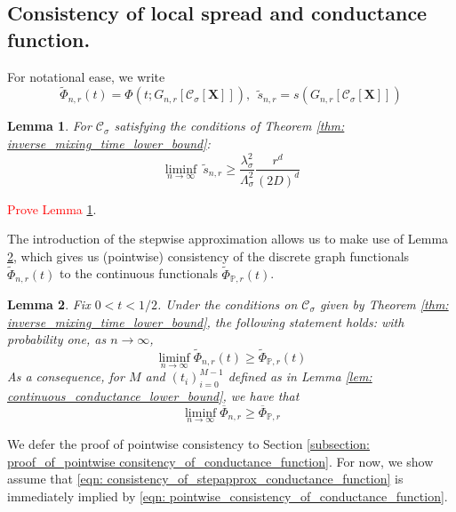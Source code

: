 \documentclass{article}
\newcommand{\1}{\mathbf{1}}
\newcommand{\Xbf}{\mathbf{X}}
\newcommand{\Pbb}{\mathbb{P}}
\newcommand{\Cset}{\mathcal{C}}
\newcommand{\Csig}{\Cset_{\sigma}}
\theoremstyle{aldenthm}
\newtheorem{lemma}{Lemma}
\begin{document}
\subsection{Consistency of local spread and conductance function.}
\label{sec: consistency}

For notational ease, we write 
\begin{equation*}
\widetilde{\Phi}_{n,r}(t) = \Phi(t; G_{n,r}[\Csig[\Xbf]]), ~~ \widetilde{s}_{n,r} = s(G_{n,r}[\Csig[\Xbf]])
\end{equation*}

\begin{lemma}
	\label{lem: local_spread_lower_bound}
	For $\Csig$ satisfying the conditions of Theorem \ref{thm: inverse_mixing_time_lower_bound}:
	\begin{equation*}
	\liminf_{n \to \infty}~ \widetilde{s}_{n,r} \geq \frac{\lambda_{\sigma}^2}{\Lambda_{\sigma}^2} \frac{r^d}{(2D)^d}
	\end{equation*}
\end{lemma}

\textcolor{red}{Prove Lemma \ref{lem: local_spread_lower_bound}}.

The introduction of the stepwise approximation allows us to make use of Lemma \ref{lem: consistency_of_conductance_function}, which gives us (pointwise) consistency of the discrete graph functionals $\widetilde{\Phi}_{n,r}(t)$ to the continuous functionals $\widetilde{\Phi}_{\Pbb,r}(t)$. 

\begin{lemma}
	\label{lem: consistency_of_conductance_function}
	Fix $0 < t < 1/2$. Under the conditions on $\Csig$ given by Theorem \ref{thm: inverse_mixing_time_lower_bound}, the following statement holds: with probability one, as $n \to \infty$,
	\begin{equation}
	\label{eqn: pointwise_consistency_of_conductance_function}
	\liminf_{n \to \infty} \widetilde{\Phi}_{n,r}(t) \geq \widetilde{\Phi}_{\Pbb,r}(t)
	\end{equation}
	As a consequence, for $M$ and $(t_i)_{i=0}^{M-1}$ defined as in Lemma \ref{lem: continuous_conductance_lower_bound}, we have that
	\begin{equation}
	\label{eqn: consistency_of_stepapprox_conductance_function}
	\liminf_{n \to \infty} \overline{\Phi}_{n,r} \geq \overline{\Phi}_{\Pbb,r}
	\end{equation}
\end{lemma}
We defer the proof of pointwise consistency to Section \ref{subsection: proof_of_pointwise consitency_of_conductance_function}. For now, we show assume  that \eqref{eqn: consistency_of_stepapprox_conductance_function} is immediately implied by \eqref{eqn: pointwise_consistency_of_conductance_function}.
\end{document}
